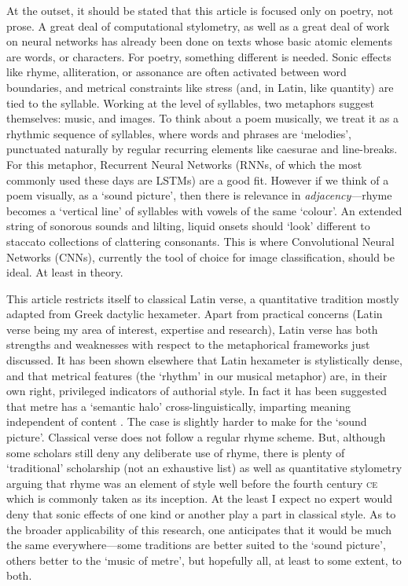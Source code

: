 \documentclass[
    twocolumn,
    hf,
]{ceurart}
\begin{document}
At the outset, it should be stated that this article is focused only on poetry,
not prose. A great deal of computational stylometry, as well as a great deal of
work on neural networks has already been done on texts whose basic atomic
elements are words, or characters. For poetry, something different is needed.
Sonic effects like rhyme, alliteration, or assonance are often activated between
word boundaries, and metrical constraints like stress (and, in Latin, like
quantity) are tied to the syllable. Working at the level of syllables, two
metaphors suggest themselves: music, and images. To think about a poem
musically, we treat it as a rhythmic sequence of syllables, where words and
phrases are `melodies', punctuated naturally by regular recurring elements like
caesurae and line-breaks. For this metaphor, Recurrent Neural Networks (RNNs, of
which the most commonly used these days are LSTMs) are a good fit. However if we
think of a poem visually, as a `sound picture', then there is relevance in
\emph{adjacency}---rhyme becomes a `vertical line' of syllables with vowels of
the same `colour'. An extended string of sonorous sounds and lilting, liquid
onsets should `look' different to staccato collections of clattering consonants.
This is where Convolutional Neural Networks (CNNs), currently the tool of choice
for image classification, should be ideal. At least in theory.

This article restricts itself to classical Latin verse, a quantitative tradition
mostly adapted from Greek dactylic hexameter. Apart from practical concerns
(Latin verse being my area of interest, expertise and research), Latin verse has
both strengths and weaknesses with respect to the metaphorical frameworks just
discussed. It has been shown elsewhere \cite{nagy2021metre} that Latin hexameter
is stylistically dense, and that metrical features (the `rhythm' in our musical
metaphor) are, in their own right, privileged indicators of authorial style. In
fact it has been suggested that metre has a `semantic halo'
cross-linguistically, imparting meaning independent of content
\cite{sela_semhalo}. The case is slightly harder to make for the `sound
picture'. Classical verse does not follow a regular rhyme scheme. But, although
some scholars still deny any deliberate use of rhyme, there is plenty of
`traditional' scholarship
\cite{herescu_poesie_1960}\cite{deutsch_1978}\cite{clarke_intentional_1972}\cite{guggenheimer_rhyme_1972}
(not an exhaustive list) as well as quantitative stylometry
\cite{nagy_rhyme_2022} arguing that rhyme was an element of style well before
the fourth century \textsc{ce} which is commonly taken as its inception. At the
least I expect no expert would deny that sonic effects of one kind or another
play a part in classical style. As to the broader applicability of this
research, one anticipates that it would be much the same everywhere---some
traditions are better suited to the `sound picture', others better to the `music
of metre', but hopefully all, at least to some extent, to both.
\end{document}
